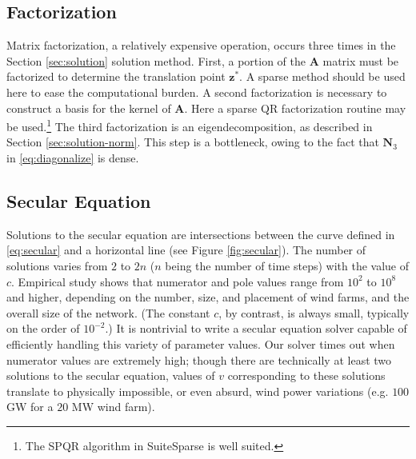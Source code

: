 \documentclass[journal,twoside]{IEEEtran}
\renewcommand{\vec}[1]{\mathbf{#1}}
\begin{document}
\subsection{Factorization}\label{sec:implementation-factorization}
Matrix factorization, a relatively expensive operation, occurs three times in the Section \ref{sec:solution} solution method. First, a portion of the $\mathbf{A}$ matrix must be factorized to determine the translation point $\vec{z}^*$. A sparse method should be used here to ease the computational burden. 
A second factorization is necessary to construct a basis for the kernel of $\mathbf{A}$. Here a sparse QR factorization routine may be used.\footnote{The SPQR algorithm in SuiteSparse \cite{foster2011} is well suited.} The third factorization is an eigendecomposition, as described in Section \ref{sec:solution-norm}. This step is a bottleneck, owing to the fact that $\mathbf{N}_3$ in \eqref{eq:diagonalize} is dense.

\subsection{Secular Equation}\label{sec:implementation-secular}
Solutions to the secular equation are intersections between the curve defined in \eqref{eq:secular} and a horizontal line (see Figure \ref{fig:secular}). The number of solutions varies from $2$ to $2n$ ($n$ being the number of time steps) with the value of $c$. Empirical study shows that numerator and pole values range from $10^2$ to $10^8$ and higher, depending on the number, size, and placement of wind farms, and the overall size of the network.
(The constant $c$, by contrast, is always small, typically on the order of $10^{-2}$.) It is nontrivial to write a secular equation solver capable of efficiently handling this variety of parameter values. Our solver times out when numerator values are extremely high; though there are technically at least two solutions to the secular equation, values of $v$ corresponding to these solutions translate to physically impossible, or even absurd, wind power variations (e.g. $100$ GW for a $20$ MW wind farm).
\end{document}
